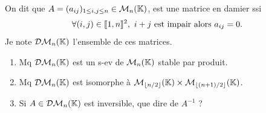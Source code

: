 \begin{statementbox}
On dit que $A=(a_{ij})_{1\leq i,j\leq n}\in\mathcal M_n(\mathbb K)$, est une matrice en damier ssi
\[
\forall(i,j)\in\llbracket 1,n\rrbracket^2,\ i+j\text{ est impair alors }a_{ij}=0.
\]
Je note $\mathcal{DM}_n(\mathbb K)$ l'ensemble de ces matrices.
\begin{enumerate}[label=\alph*.]
  \item Mq $\mathcal{DM}_n(\mathbb K)$ est un s-ev de $\mathcal M_n(\mathbb K)$ stable par produit.
  \item Mq $\mathcal{DM}_n(\mathbb K)$ est isomorphe à
  $\mathcal M_{\lfloor n/2\rfloor}(\mathbb K)\times\mathcal M_{\lfloor(n+1)/2\rfloor}(\mathbb K)$.
  \item Si $A\in\mathcal{DM}_n(\mathbb K)$ est inversible, que dire de $A^{-1}$ ?
\end{enumerate}
\end{statementbox}

